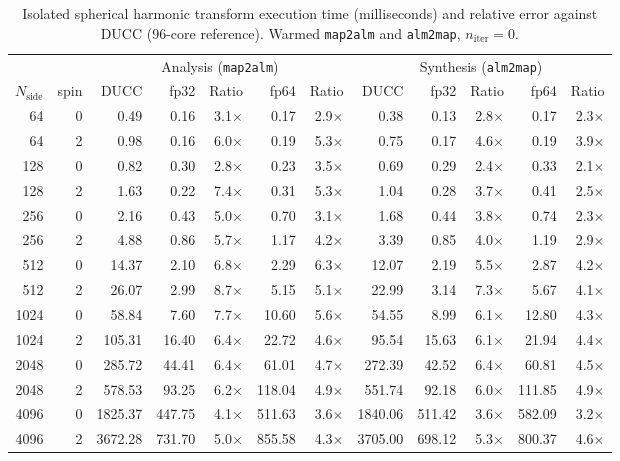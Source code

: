 \begin{table}
\centering
\caption{Isolated spherical harmonic transform execution time (milliseconds) and relative error against DUCC (96-core reference). Warmed \texttt{map2alm} and \texttt{alm2map}, $n_{\mathrm{iter}}=0$.}
\label{tab:sht_v2}
\small
\begin{tabular}{@{}rrrrrrrrrrrr@{}}
\toprule
& & \multicolumn{5}{c}{Analysis (\texttt{map2alm})} & \multicolumn{5}{c}{Synthesis (\texttt{alm2map})} \\
\cmidrule(lr){3-7} \cmidrule(lr){8-12}
$N_{\mathrm{side}}$ & spin & DUCC & fp32 & Ratio & fp64 & Ratio & DUCC & fp32 & Ratio & fp64 & Ratio \\
\midrule
64 & 0 & 0.49 & 0.16 & 3.1$\times$ & 0.17 & 2.9$\times$ & 0.38 & 0.13 & 2.8$\times$ & 0.17 & 2.3$\times$ \\
64 & 2 & 0.98 & 0.16 & 6.0$\times$ & 0.19 & 5.3$\times$ & 0.75 & 0.17 & 4.6$\times$ & 0.19 & 3.9$\times$ \\
128 & 0 & 0.82 & 0.30 & 2.8$\times$ & 0.23 & 3.5$\times$ & 0.69 & 0.29 & 2.4$\times$ & 0.33 & 2.1$\times$ \\
128 & 2 & 1.63 & 0.22 & 7.4$\times$ & 0.31 & 5.3$\times$ & 1.04 & 0.28 & 3.7$\times$ & 0.41 & 2.5$\times$ \\
256 & 0 & 2.16 & 0.43 & 5.0$\times$ & 0.70 & 3.1$\times$ & 1.68 & 0.44 & 3.8$\times$ & 0.74 & 2.3$\times$ \\
256 & 2 & 4.88 & 0.86 & 5.7$\times$ & 1.17 & 4.2$\times$ & 3.39 & 0.85 & 4.0$\times$ & 1.19 & 2.9$\times$ \\
512 & 0 & 14.37 & 2.10 & 6.8$\times$ & 2.29 & 6.3$\times$ & 12.07 & 2.19 & 5.5$\times$ & 2.87 & 4.2$\times$ \\
512 & 2 & 26.07 & 2.99 & 8.7$\times$ & 5.15 & 5.1$\times$ & 22.99 & 3.14 & 7.3$\times$ & 5.67 & 4.1$\times$ \\
1024 & 0 & 58.84 & 7.60 & 7.7$\times$ & 10.60 & 5.6$\times$ & 54.55 & 8.99 & 6.1$\times$ & 12.80 & 4.3$\times$ \\
1024 & 2 & 105.31 & 16.40 & 6.4$\times$ & 22.72 & 4.6$\times$ & 95.54 & 15.63 & 6.1$\times$ & 21.94 & 4.4$\times$ \\
2048 & 0 & 285.72 & 44.41 & 6.4$\times$ & 61.01 & 4.7$\times$ & 272.39 & 42.52 & 6.4$\times$ & 60.81 & 4.5$\times$ \\
2048 & 2 & 578.53 & 93.25 & 6.2$\times$ & 118.04 & 4.9$\times$ & 551.74 & 92.18 & 6.0$\times$ & 111.85 & 4.9$\times$ \\
4096 & 0 & 1825.37 & 447.75 & 4.1$\times$ & 511.63 & 3.6$\times$ & 1840.06 & 511.42 & 3.6$\times$ & 582.09 & 3.2$\times$ \\
4096 & 2 & 3672.28 & 731.70 & 5.0$\times$ & 855.58 & 4.3$\times$ & 3705.00 & 698.12 & 5.3$\times$ & 800.37 & 4.6$\times$ \\
\bottomrule
\end{tabular}
\end{table}
